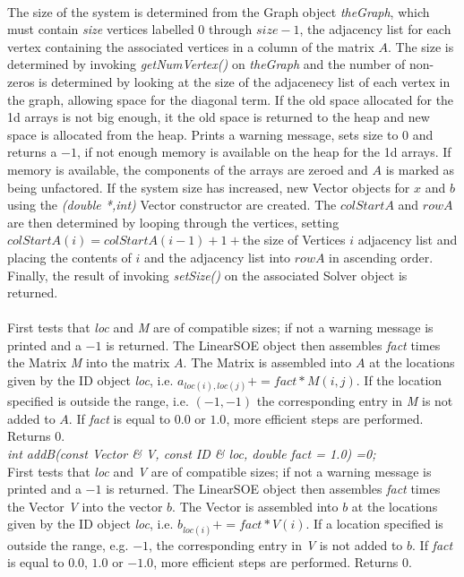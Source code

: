  \\ 
The size of the system is determined from the Graph object {\em
theGraph}, which must contain {\em size} vertices labelled $0$ through
$size-1$, the adjacency list for each vertex containing the associated
vertices in a column of the matrix $A$. The size is determined by
invoking {\em getNumVertex()} on {\em theGraph} and the number of
non-zeros is determined by looking at the size of the adjacenecy list
of each vertex in the graph, allowing space for the diagonal term. If
the old space allocated for the 1d arrays is not big enough, it the
old space is returned to the heap and new space is allocated from the
heap. Prints a warning message, sets size to $0$ and returns a $-1$,
if not enough memory is available on the heap for the 1d arrays. If
memory is available, the components of the arrays are 
zeroed and $A$ is marked as being unfactored. If the system size has
increased, new Vector objects for $x$ and $b$ using the {\em (double
*,int)} Vector constructor are created. The $colStartA$ and $rowA$ are
then determined by looping through the vertices, setting $colStartA(i)
= colStartA(i-1) + 1 + $the size of Vertices $i$ adjacency list and 
placing the contents of $i$ and the adjacency list into $rowA$ in
ascending order. Finally, the result of invoking {\em setSize()} on
the associated Solver object is returned. \\ 


 \\
First tests that {\em loc} and {\em M} are of compatible sizes; if not
a warning message is printed and a $-1$ is returned. The LinearSOE
object then assembles {\em fact} times the Matrix {\em 
M} into the matrix $A$. The Matrix is assembled into $A$ at the
locations given by the ID object {\em loc}, i.e. $a_{loc(i),loc(j)} +=
fact * M(i,j)$. If the location specified is outside the range,
i.e. $(-1,-1)$ the corresponding entry in {\em M} is not added to
$A$. If {\em fact} is equal to $0.0$ or $1.0$, more efficient steps
are performed. Returns $0$.  \\


{\em int addB(const Vector \& V, const ID \& loc,
double fact = 1.0) =0;} \\
First tests that {\em loc} and {\em V} are of compatible sizes; if not
a warning message is printed and a $-1$ is returned. The LinearSOE
object then assembles {\em fact} times the Vector {\em V} into
the vector $b$. The Vector is assembled into $b$ at the locations
given by the ID object {\em loc}, i.e. $b_{loc(i)} += fact * V(i)$. If a
location specified is outside the range, e.g. $-1$, the corresponding
entry in {\em V} is not added to $b$. If {\em fact} is equal to $0.0$,
$1.0$ or $-1.0$, more efficient steps are performed. Returns $0$. \\


